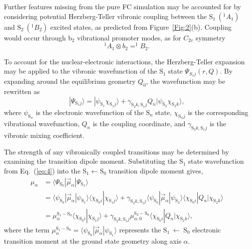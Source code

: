 \documentclass[journal=jpcafh,manuscript=article,layout=onecolumn, 12pt]{achemso}
\begin{document}
Further features missing from the pure FC simulation may be accounted for by considering potential Herzberg-Teller vibronic coupling between the $\text{S}_1~(^1A_1)$ and $\text{S}_2~(^1B_2)$ excited states, as predicted from Figure~\ref{Fig:2}(b). Coupling would occur through b$_2$ vibrational promoter modes, as for $C_{2v}$ symmetry
\begin{equation}
^1A_1 \otimes b_2 = ^1B_2.
\label{eq:3}
\end{equation}

To account for the nuclear-electronic interactions, the Herzberg-Teller expansion may be applied to the vibronic wavefunction of the $\text{S}_1$ state $\Psi_{S_1j}(r,Q)$. By expanding around the equilibrium geometry $Q_0$, the wavefunction may be rewritten as 
\begin{equation}
|\Psi_{\text{S}_1j} \rangle = |\psi_{\text{S}_1} \chi_{\text{S}_1j} \rangle + \gamma_{\text{S}_2k,\text{S}_1j}Q_n|\psi_{\text{S}_2} \chi_{\text{S}_2k}\rangle, 
\label{eq:4}
\end{equation}
where $\psi_{\text{S}_n}$ is the electronic wavefunction of the $\text{S}_n$ state, $\chi_{\text{S}_nj}$ is the corresponding vibrational wavefunction, $Q_n$ is the coupling coordinate, and $\gamma_{\text{S}_2k,\text{S}_1j}$ is the vibronic mixing coefficient.

The strength of any vibronically coupled transitions may be determined by examining the
transition dipole moment. Substituting the $\text{S}_1$ state wavefunction from Eq.~(\ref{eq:4}) into the $\text{S}_1\leftarrow \text{S}_0$ transition dipole moment gives,
\begin{align}
\mu_{\alpha}&=\langle\Psi_{\text{S}_0}|\vec{\mu}_{\alpha}|\Psi_{\text{S}_1}\rangle\\
&=\langle\psi_{\text{S}_0}|\vec{\mu}_{\alpha}|\psi_{\text{S}_1}\rangle\langle\chi_{\text{S}_0i}|\chi_{\text{S}_1j}\rangle +
\gamma_{\text{S}_2k,\text{S}_1j}\langle\psi_{\text{S}_0}|\vec{\mu}_{\alpha}|\psi_{\text{S}_2}\rangle\langle\chi_{\text{S}_0i}|Q_n|\chi_{\text{S}_2k}\rangle\\
&=\mu_{\alpha}^{\text{S}_1-\text{S}_0}\langle\chi_{\text{S}_0i}|\chi_{\text{S}_1j}\rangle + \gamma_{\text{S}_2k,\text{S}_1j}\mu_{\alpha:0}^{\text{S}_2-\text{S}_0}\langle\chi_{\text{S}_0i}|Q_n|\chi_{\text{S}_2k}\rangle,
\label{eq:5}
\end{align}
where the term $\mu_{\alpha}^{\text{S}_1-\text{S}_0}= \langle\psi_{\text{S}_0}|\vec{\mu}_{\alpha}|\psi_{\text{S}_1}\rangle$ represents the $\text{S}_1~\leftarrow~\text{S}_0$ electronic transition moment at the ground state geometry along axis $\alpha$.
\end{document}
